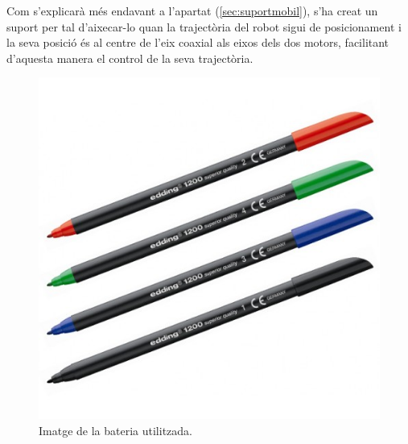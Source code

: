 Com s’explicarà més endavant a l'apartat (\ref{sec:suportmobil}), s’ha creat un suport per tal d’aixecar-lo quan la trajectòria del robot sigui de posicionament i la seva posició és al centre de l’eix coaxial als eixos dels dos motors, facilitant d’aquesta manera el control de la seva trajectòria. 

\begin{figure}[H]
	\centering
	\includegraphics[scale=0.3]{retolador.png}
	\caption{Imatge de la bateria utilitzada.}
	\label{fig:retolador}
\end{figure}